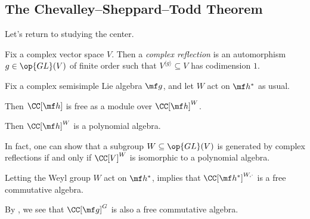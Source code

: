 \documentclass[../notes.tex]{subfiles}
\begin{document}
\subsection{The Chevalley--Sheppard--Todd Theorem}
Let's return to studying the center.
\begin{definition}
	Fix a complex vector space $V$. Then a \textit{complex reflection} is an automorphism $g\in\op{GL}(V)$ of finite order such that $V^{\langle g\rangle}\subseteq V$ has codimension $1$.
\end{definition}
\begin{theorem} \label{thm:easy-cst}
	Fix a complex semisimple Lie algebra $\mf g$, and let $W$ act on $\mf h^*$ as usual. %
	\begin{listalph}
		\item Then $\CC[\mf h]$ is free as a module over $\CC[\mf h]^W$.
		\item Then $\CC[\mf h]^W$ is a polynomial algebra.
	\end{listalph}
\end{theorem}
\begin{remark}
	In fact, one can show that a subgroup $W\subseteq\op{GL}(V)$ is generated by complex reflections if and only if $\CC[V]^W$ is isomorphic to a polynomial algebra.
\end{remark}
\begin{example}
	Letting the Weyl group $W$ act on $\mf h^*$,  implies that $\CC[\mf h^*]^{W,\cdot}$ is a free commutative algebra.
\end{example}
\begin{example}
	By , we see that $\CC[\mf g]^G$ is also a free commutative algebra.
\end{example}
\end{document}
